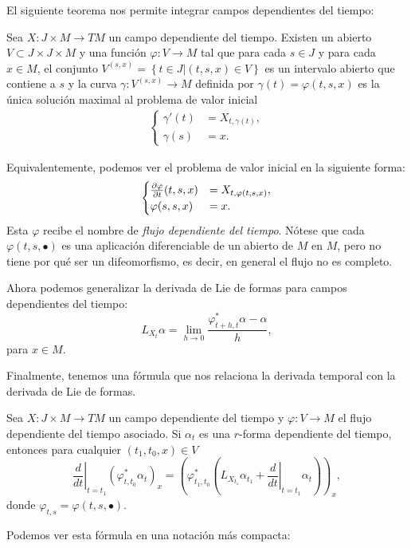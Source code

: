   El siguiente teorema nos permite integrar campos dependientes del tiempo:
  \begin{thm}
    Sea $X:J\times M \rightarrow TM$ un campo dependiente del tiempo. Existen un abierto $V\subset J\times J\times M$ y una función $\varphi:V\rightarrow M$ tal que para cada $s\in J$ y para cada $x\in M$, el conjunto $V^{(s,x)}=\left\{ t\in J | (t,s,x) \in V \right\}$ es un intervalo abierto que contiene a $s$ y la curva $\gamma:V^{(s,x)}\rightarrow M$ definida por $\gamma(t)=\varphi(t,s,x)$ es la única solución maximal al problema de valor inicial
    \begin{align*}
      \begin{cases}
      \gamma'(t)&=X_{t,\gamma(t)}, \\
      \gamma(s)&=x.
    \end{cases}
    \end{align*}
  \end{thm}
    Equivalentemente, podemos ver el problema de valor inicial en la siguiente forma:
    \begin{align*}
      \begin{cases}
      \frac{\partial \varphi}{\partial t}(t,s,x)&=X_{t,\varphi(t,s,x)}, \\
      \varphi(s,s,x)&=x.
    \end{cases}
    \end{align*}
    Esta $\varphi$ recibe el nombre de \emph{flujo dependiente del tiempo}. Nótese que cada $\varphi(t,s,\bullet)$ es una aplicación diferenciable de un abierto de $M$ en $M$, pero no tiene por qué ser un difeomorfismo, es decir, en general el flujo no es completo.

  Ahora podemos generalizar la derivada de Lie de formas para campos dependientes del tiempo:
  \begin{equation*}
    L_{X_{t}}\alpha=\lim_{h\rightarrow 0}\frac{\varphi^*_{t+h,t} \alpha - \alpha}{h},
  \end{equation*}
  para $x\in M$.
  
  Finalmente, tenemos una fórmula que nos relaciona la derivada temporal con la derivada de Lie de formas.
  \begin{prop}
    Sea $ X:J\times M \rightarrow TM $ un campo dependiente del tiempo y $ \varphi:V\rightarrow M $ el flujo dependiente del tiempo asociado. Si $\alpha_t$ es una $r$-forma dependiente del tiempo, entonces para cualquier $(t_1,t_0,x)\in V$ 
   \begin{equation*}
     \left.\frac{d}{dt}\right\lvert _{t=t_1}\left(\varphi^*_{t,t_0} \alpha_t\right)_x = \left(\varphi^*_{t_1,t_0} \left( L_{X_{t_1}}\alpha_{t_1} + \left.\frac{d}{dt}\right\lvert_{t=t_1}\alpha_t\right) \right)_x,
   \end{equation*}
   donde $\varphi_{t,s}=\varphi(t,s,\bullet)$. 
\end{prop}
   Podemos ver esta fórmula en una notación más compacta:

